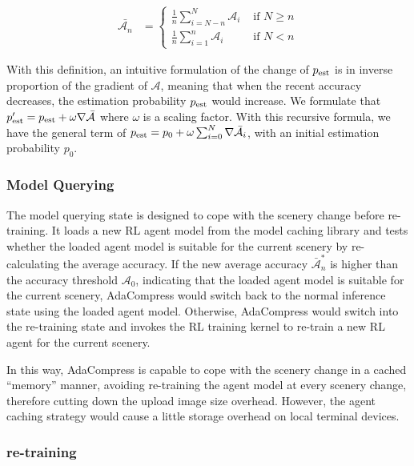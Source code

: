 \begin{align*}
\bar{\mathcal{A}_n} &=
\begin{cases}
\frac{1}{n}\sum_{i=N-n}^{N} \mathcal{A}_i & \text{ if } N \geq n \\ 
\frac{1}{n}\sum_{i=1}^{n} \mathcal{A}_i & \text{ if } N < n 
\end{cases}
\end{align*}

With this definition, an intuitive formulation of the change of $ p_{\rm est} $ is in inverse proportion of the gradient of $ \mathcal{A} $, meaning that when the recent accuracy decreases, the estimation probability $ p_{\rm est} $ would increase. We formulate that $ p'_{\rm est} = p_{\rm est} + \omega \nabla \bar{\mathcal{A}} $ where $ \omega $ is a scaling factor. With this recursive formula, we have the general term of $p_{\rm est} = p_0 + \omega \sum_{i=0}^{N} \nabla \bar{\mathcal{A}_i} $, with an initial estimation probability $ p_0 $.

\subsubsection{\textbf{Model Querying}}

The model querying state is designed to cope with the scenery change before re-training. It loads a new RL agent model from the model caching library and tests whether the loaded agent model is suitable for the current scenery by re-calculating the average accuracy. If the new average accuracy $ \bar{\mathcal{A}}^*_n $ is higher than the accuracy threshold $ \mathcal{A}_0 $, indicating that the loaded agent model is suitable for the current scenery, AdaCompress would switch back to the normal inference state using the loaded agent model. Otherwise, AdaCompress would switch into the re-training state and invokes the RL training kernel to re-train a new RL agent for the current scenery.

In this way, AdaCompress is capable to cope with the scenery change in a cached ``memory'' manner, avoiding re-training the agent model at every scenery change, therefore cutting down the upload image size overhead. However, the agent caching strategy would cause a little storage overhead on local terminal devices.


\subsubsection{\textbf{re-training}}

